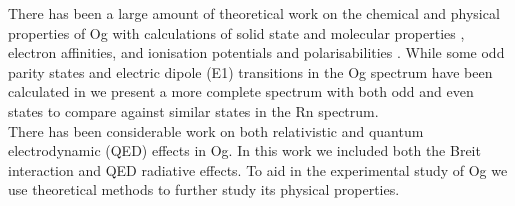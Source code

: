 \documentclass[10pt,a4paper, twoside]{report}
\begin{document}
 There has been a large amount of  theoretical work on the chemical and physical properties of Og with calculations of solid state and molecular properties \cite{Kullie2012, Shee2015, Nash1999, Nash2005, Peter2016}, electron affinities\cite{Pitzer1975, EliavOg1996, PershinaOg2008, Hangele2012, Goidenko2003}, and ionisation potentials and polarisabilities \cite{PershinaOg2008, Desclaux1973, Nash2005, Jerabek2018}. While some odd parity states and electric dipole (E1) transitions in the Og spectrum have been calculated in \cite{Indelicato2007} we present a more complete spectrum with both odd and even states to compare against similar states in the Rn spectrum. \\
There has been considerable work on both relativistic and quantum electrodynamic (QED) effects \cite{Pyykko1988, Jerabek2018, Goidenko2003, Eliav2015, Indelicato2007, Thierfelder2010} in Og. In this work we included both the Breit interaction and QED radiative effects. To aid in the experimental study of Og we use  theoretical methods to further study its physical properties. 
\end{document}

